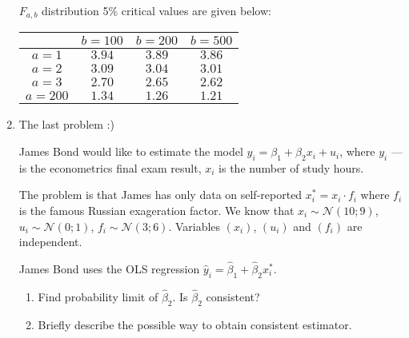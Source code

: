 \documentclass[12pt]{article}
\def \cN{\mathcal{N}}
\begin{document}
\begin{enumerate}
$F_{a,b}$ distribution 5\% critical values are given below:

\begin{tabular}{cccc}
	\toprule
	& $b=100$ & $b=200$ & $b=500$  \\
	\midrule
	$a=1$ & $3.94$ & $3.89$ & $3.86$  \\
	$a=2$ & $3.09$ & $3.04$ & $3.01$ \\
	$a=3$ & $2.70$ & $2.65$ & $2.62$ \\
	$a=200$ & $1.34$ & $1.26$ & $1.21$ \\
	\bottomrule
\end{tabular}


\item The last problem :)

James Bond would like to estimate the model $y_i = \beta_1 + \beta_2 x_i + u_i$,
where $y_i$ — is the econometrics final exam result, $x_i$ is the number of study hours.

The problem is that James has only data on self-reported $x^*_i = x_i \cdot f_i$ where
$f_i$ is the famous Russian exageration factor. We know that $x_i \sim \cN(10;9)$,
$u_i \sim \cN(0;1)$, $f_i \sim \cN(3;6)$. Variables $(x_i)$, $(u_i)$ and $(f_i)$
are independent.

James Bond uses the OLS regression $\hat y_i = \hat \beta_1 + \hat\beta_2 x_i^*$.

\begin{enumerate}
	\item Find probability limit of $\hat\beta_2$. Is $\hat \beta_2$ consistent?
	\item Briefly describe the possible way to obtain consistent estimator.
\end{enumerate}





\end{enumerate}
\end{document}
